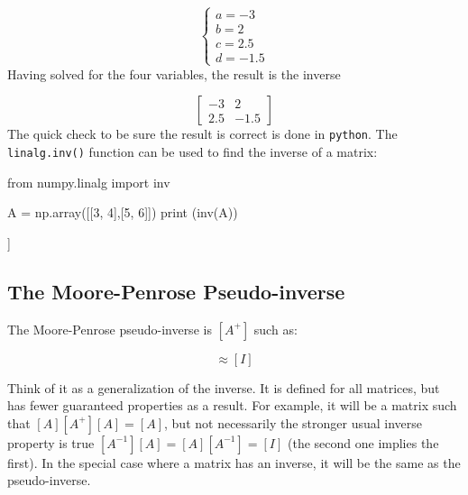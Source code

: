 \begin{equation*}
\begin{cases}
a=−3\\
b=2\\
c=2.5\\
d=−1.5
\end{cases}
\end{equation*}
Having solved for the four variables, the result is the inverse

\begin{equation*}
\begin{bmatrix}
−3 & 2\\
2.5 & −1.5
\end{bmatrix}
\end{equation*}
The quick check to be sure the result is correct is done in \texttt{python}. The \texttt{linalg.inv()} function can be used to find the inverse of a matrix:

\begin{ipython}
from numpy.linalg import inv

A = np.array([[3, 4],[5, 6]])	
print (inv(A))
\end{ipython}
\begin{ioutput}
[[-3.   2. ]
 [ 2.5 -1.5]]
\end{ioutput}

\subsection{The Moore-Penrose Pseudo-inverse}
\label{sec:the-moore-penrose-pseudoinverse}

The Moore-Penrose pseudo-inverse is $[A^+]$ such as:

\begin{equation*}
[A][A^+]≈[I]
\end{equation*}

Think of it as a generalization of the inverse. It is defined for all matrices, but has fewer guaranteed properties as a result. For example, it will be a matrix such that $[𝐴][𝐴^+][𝐴]=[𝐴]$, but not necessarily the stronger usual inverse property is true $[𝐴^{−1}][𝐴]=[𝐴][𝐴^{−1}]=[𝐼]$ (the second one implies the first). In the special case where a matrix has an inverse, it will be the same as the pseudo-inverse.


